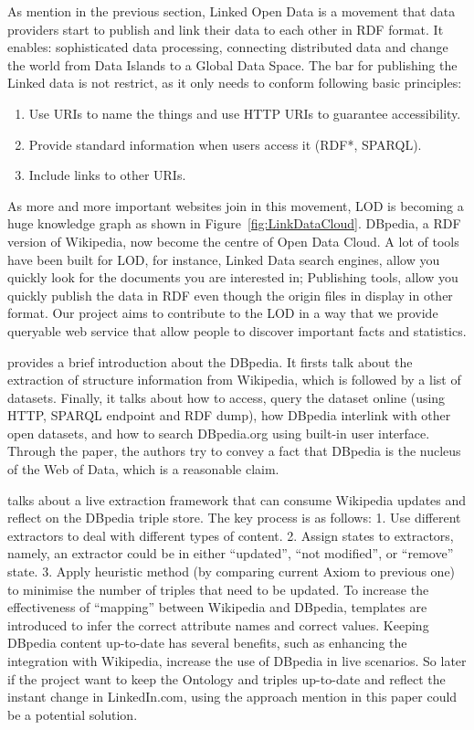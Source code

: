 As mention in the previous section, Linked Open Data is a movement that data providers start to publish and link their data to each other in RDF format. It enables\cite{heath2011linked}: sophisticated data processing, connecting distributed data and change the world from Data Islands to a Global Data Space. The bar for publishing the Linked data is not restrict, as it only needs to conform following basic principles\cite{berners2006design}: 
	
	\begin{enumerate}
	\item
	Use URIs to name the things and use HTTP URIs to guarantee accessibility.
	\item
	Provide standard information when users access it (RDF*, SPARQL). 
	\item
	Include links to other URIs. 
	\end{enumerate}
	
As more and more important websites join in this movement, LOD is becoming a huge knowledge graph as shown in Figure~\ref{fig:LinkDataCloud}. DBpedia, a RDF version of Wikipedia, now become the centre of Open Data Cloud. A lot of tools have been built for LOD\cite{bizer2009}, for instance, Linked Data search engines, allow you quickly look for the documents you are interested in; Publishing tools, allow you quickly publish the data in RDF even though the origin files in display in other format. Our project aims to contribute to the LOD in a way  that we provide queryable web service that allow people to discover important facts and statistics.

\cite{auer2007} provides a brief introduction about the DBpedia. It firsts talk about the extraction of structure information from Wikipedia, which is followed by a list of datasets. Finally, it talks about how to access, query the dataset online (using HTTP, SPARQL endpoint and RDF dump), how DBpedia interlink with other open datasets, and how to search DBpedia.org using built-in user interface. Through the paper, the authors try to convey a fact that DBpedia is the nucleus of the Web of Data, which is a reasonable claim.

\cite{hellmann2009} talks about a live extraction framework that can consume Wikipedia updates and reflect on the DBpedia triple store. The key process is as follows: 1. Use different extractors to deal with different types of content. 2. Assign states to extractors, namely, an extractor could be in either ``updated'', ``not modified'', or ``remove'' state. 3. Apply heuristic method (by comparing current Axiom to previous one) to minimise the number of triples that need to be updated. To increase the effectiveness of ``mapping'' between Wikipedia and DBpedia, templates are introduced to infer the correct attribute names and correct values. Keeping DBpedia content up-to-date has several benefits, such as enhancing the integration with Wikipedia, increase the use of DBpedia in live scenarios. So later if the project want to keep the Ontology and triples up-to-date and reflect the instant change in LinkedIn.com, using the approach mention in this paper could be a potential solution.

